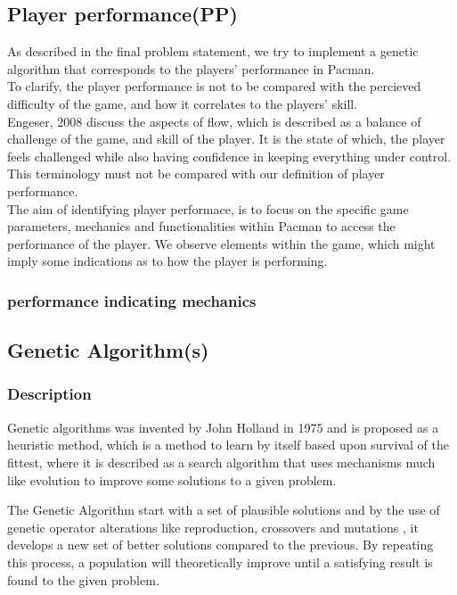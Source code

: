 \subsection{Player performance(PP)}

As described in the final problem statement, we try to implement a genetic algorithm that corresponds to the players' performance in Pacman.\\

To clarify, the player performance is not to be compared with the percieved difficulty of the game, and how it correlates to the players' skill.\\ Engeser, 2008 \cite{Engeser2008} discuss the aspects of flow, which is described as a balance of challenge of the game, and skill of the player. It is the state of which, the player feels challenged while also having confidence in keeping everything under control. \cite[pp. 158]{Engeser2008}\\
This terminology must not be compared with our definition of player performance.\\

The aim of identifying player performace, is to focus on the specific game parameters, mechanics and functionalities within Pacman to access the performance of the player. We observe elements within the game, which might imply some indications as to how the player is performing.\\


\subsubsection{performance indicating mechanics}



\subsection{Genetic Algorithm(s)}

\subsubsection{Description}
Genetic algorithms was invented by John Holland in 1975 and is proposed as a heuristic method, which is a method to learn by itself based upon survival of the fittest, where it is described as a  search algorithm that uses mechanisms much like evolution to improve some solutions to a given problem. \cite[pp. 20]{Sivanandam2008}

The Genetic Algorithm start with a set of plausible solutions and by the use of genetic operator alterations like reproduction, crossovers and mutations \cite{Baltzer2014}, it develops a new set of better solutions compared to the previous. By repeating this process, a population will theoretically improve until a satisfying result is found to the given problem. \cite{BCS2013}


